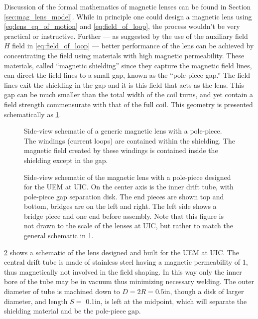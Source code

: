 Discussion of the formal mathematics of magnetic lenses can be found in Section \ref{sec:mag_lens_model}.
While in principle one could design a magnetic lens using \ref{eq:lens_eq_of_motion} and \ref{eq:field_of_loop}, the process wouldn't be very practical or instructive.
Further --- as suggested by the use of the auxiliary field $H$ field in \ref{eq:field_of_loop} --- better performance of the lens can be achieved by concentrating the field using materials with high magnetic permeability.
These materials, called ``magnetic shielding'' since they capture the magnetic field lines, can direct the field lines to a small gap, known as the ``pole-piece gap.''
The field lines exit the shielding in the gap and it is this field that acts as the lens.
This gap can be much smaller than the total width of the coil turns, and yet contain a field strength commensurate with that of the full coil.
This geometry is presented schematically as \ref{fig:polepiece-schematic}.

\begin{figure}
  \centering
  
  \caption[Schematic of a generic magnetic lens with a pole-piece]{
    Side-view schematic of a generic magnetic lens with a pole-piece.
    The windings (current loops) are contained within the shielding.
    The magnetic field created by these windings is contained inside the shielding except in the gap.
  }
  \label{fig:polepiece-schematic}
\end{figure}

\begin{figure}
  \centering
  
  \caption[Design schematic of our magnetic lens with a pole-piece]{
    Side-view schematic of the magnetic lens with a pole-piece designed for the UEM at UIC.
    On the center axis is the inner drift tube, with pole-piece gap separation disk.
    The end pieces are shown top and bottom, bridges are on the left and right.
    The left side shows a bridge piece and one end before assembly.
    Note that this figure is not drawn to the scale of the lenses at UIC, but rather to match the general schematic in \ref{fig:polepiece-schematic}.
  }
  \label{fig:polepiece-design}
\end{figure}

\ref{fig:polepiece-design} shows a schematic of the lens designed and built for the UEM at UIC.
The central drift tube is made of stainless steel having a magnetic permeability of 1, thus magnetically not involved in the field shaping.
In this way only the inner bore of the tube may be in vacuum thus minimizing necessary welding.
The outer diameter of tube is machined down to $ D = 2R = 0.5 \text{in}$, though a disk of larger diameter, and length $ S = $ 0.1in, is left at the midpoint, which will separate the shielding material and be the pole-piece gap.


